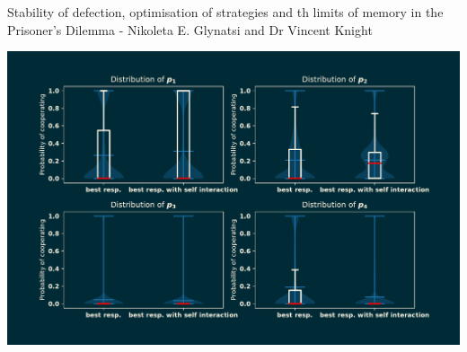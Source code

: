 \documentclass{beamer}
\begin{document}
\begin{frame}
    \begin{center}
        \vspace{-1cm}
        \normalsize{Stability of defection, optimisation of strategies and th
        limits of memory in the Prisoner's Dilemma - Nikoleta E. Glynatsi and
        Dr Vincent Knight}

        \vspace{1cm}
        
    \end{center}
\end{frame}

\begin{frame}
    \begin{center}
        \includegraphics[width=\textwidth]{static/result_self_interactions}
    \end{center}
\end{frame}
\end{document}
